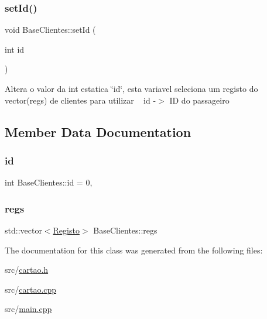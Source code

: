 \subsubsection{\texorpdfstring{set\+Id()}{setId()}}
{\footnotesize\ttfamily void Base\+Clientes\+::set\+Id (\begin{DoxyParamCaption}\item[{int}]{id }\end{DoxyParamCaption})}

Altera o valor da int estatica \char`\"{}id\char`\"{}, esta variavel seleciona um registo do vector(regs) de clientes para utilizar ~\newline
id -\/$>$ ID do passageiro 

\subsection{Member Data Documentation}
\mbox{\label{class_base_clientes_ab33dc8c88fd409fb2c6405e4487397f5}} 
\subsubsection{\texorpdfstring{id}{id}}
{\footnotesize\ttfamily int Base\+Clientes\+::id = 0\hspace{0.3cm}{\ttfamily [static]}, {\ttfamily [private]}}

\mbox{\label{class_base_clientes_a8a4ee86b51d7dbd180738619163879fe}} 
\subsubsection{\texorpdfstring{regs}{regs}}
{\footnotesize\ttfamily std\+::vector$<$\mbox{\hyperlink{class_registo}{Registo}}$>$ Base\+Clientes\+::regs\hspace{0.3cm}{\ttfamily [private]}}



The documentation for this class was generated from the following files\+:\begin{DoxyCompactItemize}
\item 
src/\mbox{\hyperlink{cartao_8h}{cartao.\+h}}\item 
src/\mbox{\hyperlink{cartao_8cpp}{cartao.\+cpp}}\item 
src/\mbox{\hyperlink{main_8cpp}{main.\+cpp}}\end{DoxyCompactItemize}

